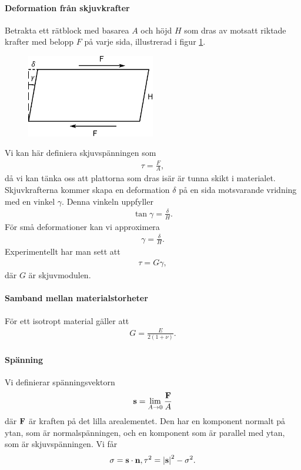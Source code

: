 \paragraph{Deformation från skjuvkrafter}
Betrakta ett rätblock med basarea $A$ och höjd $H$ som dras av motsatt riktade krafter med belopp $F$ på varje sida, illustrerad i figur \ref{fig:rectangle_twist}.
\begin{figure}[!ht]
	\centering
	\includegraphics[width = 0.5\textwidth]{./Images/rectangle_twist.eps}
	\label{fig:rectangle_twist}
\end{figure}

Vi kan här definiera skjuvspänningen som
\begin{align*}
	\tau = \frac{F}{A},
\end{align*}
då vi kan tänka oss att plattorna som dras isär är tunna skikt i materialet. Skjuvkrafterna kommer skapa en deformation $\delta$ på en sida motsvarande vridning med en vinkel $\gamma$. Denna vinkeln uppfyller
\begin{align*}
	\tan{\gamma} = \frac{\delta}{H}.
\end{align*}
För små deformationer kan vi approximera
\begin{align*}
	\gamma = \frac{\delta}{H}.
\end{align*}
Experimentellt har man sett att
\begin{align*}
	\tau = G\gamma,
\end{align*}
där $G$ är skjuvmodulen.

\paragraph{Samband mellan materialstorheter}
För ett isotropt material gäller att
\begin{align*}
	G = \frac{E}{2(1 + \nu)}.
\end{align*}

\paragraph{Spänning}
Vi definierar spänningsvektorn
\begin{align*}
	\vb{s} = \lim\limits_{A \to 0}\frac{\vb{F}}{A}
\end{align*}
där $\vb{F}$ är kraften på det lilla arealementet. Den har en komponent normalt på ytan, som är normalspänningen, och en komponent som är parallel med ytan, som är skjuvspänningen. Vi får
\begin{align*}
	\sigma = \vb{s}\cdot\vb{n}, \tau^{2} = \abs{\vb{s}}^{2} - \sigma^{2}.
\end{align*}

